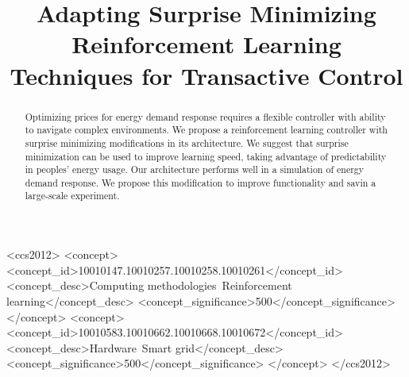 \title{Adapting Surprise Minimizing Reinforcement Learning Techniques for Transactive Control}


\begin{abstract}
Optimizing prices for energy demand response requires a flexible controller with ability to navigate complex environments. 
We propose a reinforcement learning controller with surprise minimizing modifications in its architecture. 
We suggest that surprise minimization can be used to improve learning speed, taking advantage of predictability in peoples' energy usage. Our architecture performs well in a simulation of energy demand response. We propose this modification to improve functionality and savin a large-scale experiment.   
\end{abstract}


\begin{CCSXML}
<ccs2012>
   <concept>
       <concept_id>10010147.10010257.10010258.10010261</concept_id>
       <concept_desc>Computing methodologies~Reinforcement learning</concept_desc>
       <concept_significance>500</concept_significance>
       </concept>
   <concept>
       <concept_id>10010583.10010662.10010668.10010672</concept_id>
       <concept_desc>Hardware~Smart grid</concept_desc>
       <concept_significance>500</concept_significance>
       </concept>
 </ccs2012>
\end{CCSXML}

